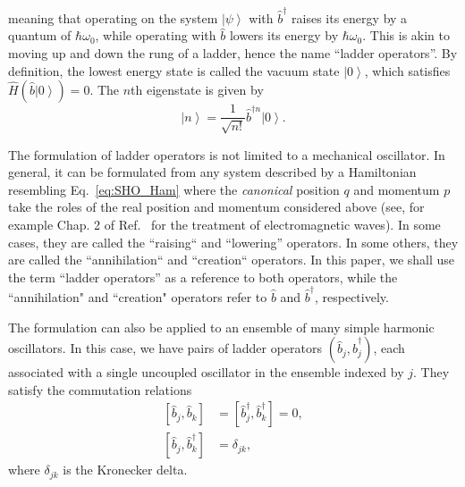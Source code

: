 \documentclass[onecolumn, 12pt, sort&compress]{elsarticle}
\newcommand{\ket}[1]{\left|{#1}\right\rangle}
\newcommand{\comm}[2]{\left[{#1},{#2}\right]}
\newcommand{\bop}{\hat{b}}
\newcommand{\bdag}{\bop^\dagger}
\newcommand{\bdagn}[1]{\bop^{\dagger {#1}}}
\begin{document}
meaning that operating on the system $\ket{\psi}$ with $\bdag$ raises its energy by a quantum of $\hbar\omega_0$, while operating with $\bop$ lowers its energy by $\hbar\omega_0$.  This is akin to moving up and down the rung of a ladder, hence the name ``ladder operators''.  By definition, the lowest energy state is called the vacuum state $\ket{0}$, which satisfies $\hat{H}\left(\bop\ket{0}\right)=0$. The $n$th eigenstate is given by
\begin{equation}
    \ket{n} = \frac{1}{\sqrt{n!}}\bdagn{n}\ket{0}.
\end{equation}

The formulation of ladder operators is not limited to a mechanical oscillator. In general, it can be formulated from any system described by a Hamiltonian resembling Eq.~\eqref{eq:SHO_Ham} where the \emph{canonical} position $q$ and momentum $p$ take the roles of the real position and momentum considered above (see, for example Chap. 2 of Ref.~\cite{gerry_introductory_2005} for the treatment of electromagnetic waves).  In some cases, they are called the ``raising`` and ``lowering'' operators.  In some others, they are called the ``annihilation`` and ``creation`` operators.  In this paper, we shall use the term ``ladder operators'' as a reference to both operators, while the ``annihilation" and ``creation" operators refer to $\bop$ and $\bdag$, respectively.

The formulation can also be applied to an ensemble of many simple harmonic oscillators.  In this case, we have pairs of ladder operators $\left(\bop_j,\bdag_j\right)$, each associated with a single uncoupled oscillator in the ensemble indexed by $j$.  They satisfy the commutation relations
\begin{subequations}
\begin{align}
    \comm{\bop_j}{\bop_k} &= \comm{\bdag_j}{\bdag_k} = 0
    \label{eq:boson_comm_1},
    \\
    \comm{\bop_j}{\bdag_k} &= \delta_{jk},
    \label{eq:boson_comm_2}
\end{align}
\end{subequations}
where $\delta_{jk}$ is the Kronecker delta. 
\end{document}
